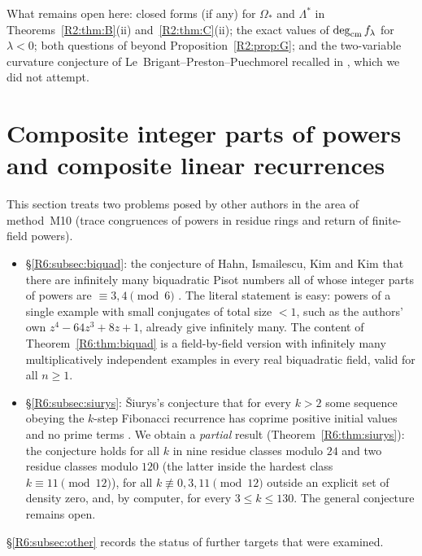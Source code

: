 \documentclass[11pt]{amsart}
\theoremstyle{definition}
\theoremstyle{remark}
\providecommand{\C}{\mathbb C}
\providecommand{\R}{\mathbb R}
\providecommand{\Q}{\mathbb Q}
\providecommand{\Z}{\mathbb Z}
\providecommand{\N}{\mathbb N}
\begin{document}
What remains open here: closed forms (if any) for $\Omega_*$ and
$\Lambda^*$ in Theorems~\ref{R2:thm:B}(ii) and~\ref{R2:thm:C}(ii); the exact
values of $\operatorname{deg}_{\mathrm{cm}} f_\lambda$ for $\lambda<0$; both questions of
\cite[Remark~4.1]{R2-QiMIA2021} beyond Proposition~\ref{R2:prop:G}; and the
two-variable curvature conjecture of Le~Brigant--Preston--Puechmorel recalled
in \cite{R2-QiAgarwal2024,R2-Qi2026}, which we did not attempt.


\providecommand{\Z}{\mathbb{Z}}
\providecommand{\Q}{\mathbb{Q}}
\providecommand{\R}{\mathbb{R}}
\providecommand{\C}{\mathbb{C}}
\providecommand{\F}{\mathbb{F}}
\providecommand{\N}{\mathbb{N}}
\providecommand{\OO}{\mathcal{O}}
\providecommand{\Tr}{\operatorname{Tr}}
\providecommand{\Nm}{\operatorname{N}}
\providecommand{\fl}[1]{\left\lfloor #1\right\rfloor}
\providecommand{\cl}[1]{\left\lceil #1\right\rceil}
\providecommand{\Rsixord}{\operatorname{ord}}

\section{Composite integer parts of powers and composite linear recurrences}
\label{R6:sec}

This section treats two problems posed by other authors in the area of method~M10
(trace congruences of powers in residue rings and return of finite-field powers).
\begin{itemize}
\item \S\ref{R6:subsec:biquad}: the conjecture of Hahn, Ismailescu, Kim and Kim that there are
infinitely many biquadratic Pisot numbers all of whose integer parts of powers are $\equiv 3,4\pmod 6$
\cite[\S5]{R6-HIKK}. The literal statement is easy: powers of a single example with small
conjugates of total size $<1$, such as the authors' own $z^4-64z^3+8z+1$, already give infinitely
many. The content of Theorem~\ref{R6:thm:biquad} is a field-by-field version with infinitely many
multiplicatively independent examples in every real biquadratic field, valid for all $n\ge1$.
\item \S\ref{R6:subsec:siurys}: \v{S}iurys's conjecture that for every $k>2$ some sequence obeying the $k$-step
Fibonacci recurrence has coprime positive initial values and no prime terms
\cite[Conjecture~1]{R6-Siurys}. We obtain a \emph{partial} result
(Theorem~\ref{R6:thm:siurys}): the conjecture holds for all $k$ in nine residue classes
modulo $24$ and two residue classes modulo $120$ (the latter inside the hardest class
$k\equiv11\pmod{12}$), for all $k\not\equiv 0,3,11\pmod{12}$ outside an explicit set of density zero,
and, by computer, for every $3\le k\le 130$. The general conjecture remains open.
\end{itemize}
\S\ref{R6:subsec:other} records the status of further targets that were examined.
\end{document}

